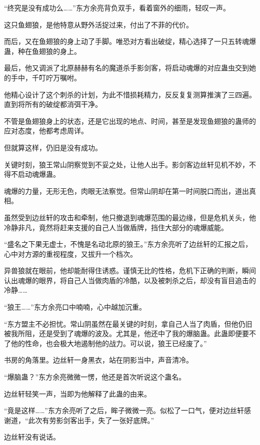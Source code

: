 
\begin{this_body}

“终究是没有成功么……”东方余亮背负双手，看着窗外的细雨，轻叹一声。

这只鱼翅狼，是他特意从野外活捉过来，付出了不菲的代价。

而后，又在鱼翅狼的身上动了手脚。唯恐对方看出破绽，精心选择了一只五转魂爆蛊，种在鱼翅狼的身上。

最后，他又调派了北原赫赫有名的魔道杀手影剑客，将启动魂爆的对应蛊虫交到她的手中，千叮咛万嘱咐。

他精心设计了这个刺杀的计划，为此不惜损耗精力，反反复复测算推演了三四遍。直到将所有的破绽都消弭干净。

不管是鱼翅狼身上的状态，还是它出现的地点、时间，甚至是发现鱼翅狼的蛊师的应对态度，他都考虑周详。

但就算这样，仍旧是没有成功。

关键时刻，狼王常山阴察觉到不妥之处，让他人出手。影剑客边丝轩见机不妙，不得不启动魂爆蛊。

魂爆的力量，无形无色，肉眼无法察觉。但常山阴却在第一时间脱口而出，道出真相。

虽然受到边丝轩的攻击和牵制，他只撤退到魂爆范围的最边缘，但是危机关头，他冷静非凡，竟然将赶来支援的自己人当做盾牌，挡住大部分的魂爆威能。

“盛名之下果无虚士，不愧是名动北原的狼王。”东方余亮听了边丝轩的汇报之后，心中对方源的重视程度，又拔升一个档次。

异兽狼就在眼前，他却能耐得住诱惑。谨慎无比的性格，危机下正确的判断，瞬间认出魂爆的眼界，将自己人当做肉盾的冷酷，以及被刺杀之后，却没有盲目追击的冷静……

“狼王……”东方余亮口中喃喃，心中越加沉重。

“东方盟主不必担忧。常山阴虽然在最关键的时刻，拿自己人当了肉盾，但他仍旧被我所阻，还是受到了魂爆的波及。尤其是，他还中了我的爆脑蛊。此蛊即便要不了他的性命，也会极大地遏制他的战力。可以说，狼王已经废了。”

书房的角落里。边丝轩一身黑衣，站在阴影当中，声音清冷。

“爆脑蛊？”东方余亮微微一愣，他还是首次听说这个蛊名。

边丝轩轻笑一声，当即为他解释了此蛊的由来。

“竟是这样……”东方余亮听了之后，眸子微微一亮。似松了一口气，便对边丝轩感谢道，“此次有劳影剑客出手，失了一张好底牌。”

边丝轩没有说话。


\end{this_body}
